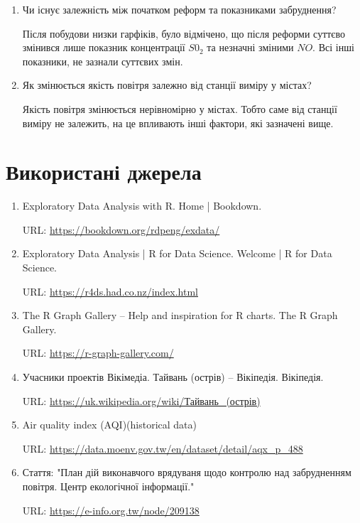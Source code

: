 \documentclass{article}
\begin{document}
\begin{enumerate}
    \item Чи існує залежність між початком реформ та показниками забруднення?
    
    Після побудови низки гарфіків, було відмічено, що після реформи суттєво змінився 
    лише показник концентрації $S0_2$ та незначні зміними $NO$. Всі інші показники, не зазнали суттєвих змін.
    
    \item Як змінюється якість повітря залежно від станції виміру у містах?
    
    Якість повітря змінюється нерівномірно у містах. Тобто саме від станції виміру не залежить, 
    на це впливають інші фактори, які зазначені вище.

\end{enumerate}


\newpage
\section{Використані джерела}
\begin{enumerate}
    \item Exploratory Data Analysis with R. Home | Bookdown. 
    
    URL:  \href{https://bookdown.org/rdpeng/exdata/}{\url{https://bookdown.org/rdpeng/exdata/}}
    
    \item Exploratory Data Analysis | R for Data Science. Welcome | R for Data Science.
    
    URL: \href{https://r4ds.had.co.nz/index.html}{\url{https://r4ds.had.co.nz/index.html}}
    \item The R Graph Gallery – Help and inspiration for R charts. The R Graph Gallery. 
    
    URL: \href{ https://r-graph-gallery.com/}{\url{https://r-graph-gallery.com/ }}

    \item Учасники проектів Вікімедіа. Тайвань (острів) – Вікіпедія. Вікіпедія.
     
    URL: \href{https://uk.wikipedia.org/wiki/Тайвань\_(острів)}{\url{https://uk.wikipedia.org/wiki/Тайвань_(острів)}} 

    \item Air quality index (AQI)(historical data) 
    
    URL: \href{https://data.moenv.gov.tw/en/dataset/detail/aqx\_p\_488}{\url{https://data.moenv.gov.tw/en/dataset/detail/aqx_p_488}}

    \item Стаття: "План дій виконавчого врядуваня щодо контролю над забрудненням повітря. Центр екологічної інформації."
    
    URL: \href{https://e-info.org.tw/node/209138}{\url{https://e-info.org.tw/node/209138}} 

\end{enumerate}
\end{document}
